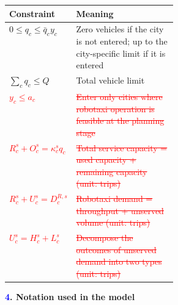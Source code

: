 \documentclass[10pt,a4paper]{article}
\newcommand{\hd}[1]{\par\vspace{8pt}\textbf{#1}\par\vspace{3pt}}
\begin{document}
{\small
\begin{tabularx}{\linewidth}{@{}>{\raggedright\arraybackslash}p{0.32\linewidth}Y@{}}
\toprule
Constraint & Meaning \\ \midrule
$0\le q_c\le\bar q_c y_c$ & Zero vehicles if the city is not entered; up to the city-specific limit if it is entered \\
$\sum_cq_c\le Q$ & Total vehicle limit \\
\textcolor{red}{\sout{$y_c\le a_c$}} & \textcolor{red}{\sout{Enter only cities where robotaxi operation is feasible at the planning stage}} \\
\textcolor{red}{\sout{$R_c^s+O_c^s=\kappa_c^s q_c$}}
& \textcolor{red}{\sout{Total service capacity = used capacity
+ remaining capacity (unit: trips)}} \\
\textcolor{red}{\sout{$R_c^s+U_c^s=D_c^{R,s}$}}
&\textcolor{red}{\sout{Robotaxi demand = throughput
+ unserved volume (unit: trips)}} \\
\textcolor{red}{\sout{$U_c^s=H_c^s+L_c^s$}}
&\textcolor{red}{\sout{Decompose the outcomes of unserved
demand into two types (unit: trips)}} \\

\bottomrule
\end{tabularx}
}

\newpage
\hd{\textcolor{blue}{4}. Notation used in the model}
\end{document}
